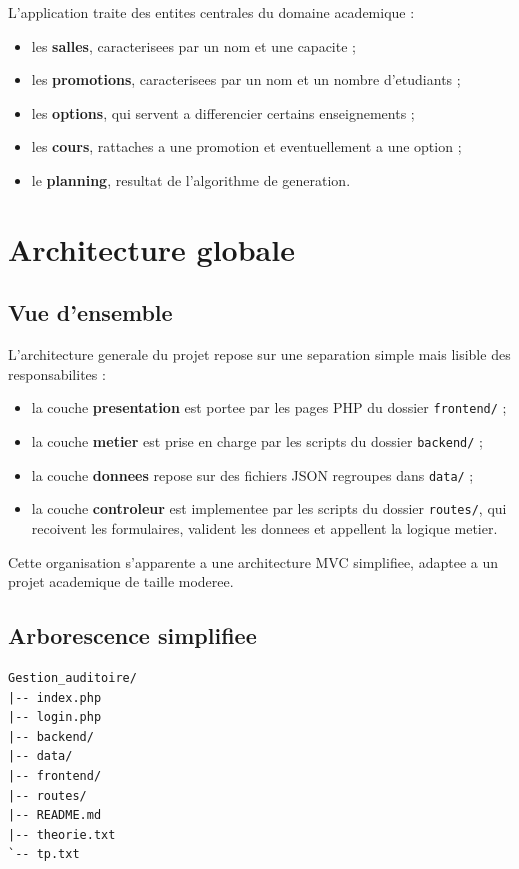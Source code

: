 \documentclass[12pt,a4paper]{article}
\begin{document}
L'application traite des entites centrales du domaine academique :
\begin{itemize}
    \item les \textbf{salles}, caracterisees par un nom et une capacite ;
    \item les \textbf{promotions}, caracterisees par un nom et un nombre d'etudiants ;
    \item les \textbf{options}, qui servent a differencier certains enseignements ;
    \item les \textbf{cours}, rattaches a une promotion et eventuellement a une option ;
    \item le \textbf{planning}, resultat de l'algorithme de generation.
\end{itemize}

\section{Architecture globale}
\subsection{Vue d'ensemble}
L'architecture generale du projet repose sur une separation simple mais lisible des responsabilites :
\begin{itemize}
    \item la couche \textbf{presentation} est portee par les pages PHP du dossier \texttt{frontend/} ;
    \item la couche \textbf{metier} est prise en charge par les scripts du dossier \texttt{backend/} ;
    \item la couche \textbf{donnees} repose sur des fichiers JSON regroupes dans \texttt{data/} ;
    \item la couche \textbf{controleur} est implementee par les scripts du dossier \texttt{routes/}, qui recoivent les formulaires, valident les donnees et appellent la logique metier.
\end{itemize}

Cette organisation s'apparente a une architecture MVC simplifiee, adaptee a un projet academique de taille moderee.

\subsection{Arborescence simplifiee}
\begin{Verbatim}[fontsize=\small]
Gestion_auditoire/
|-- index.php
|-- login.php
|-- backend/
|-- data/
|-- frontend/
|-- routes/
|-- README.md
|-- theorie.txt
`-- tp.txt
\end{Verbatim}
\end{document}
